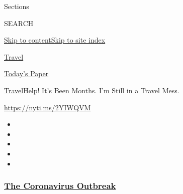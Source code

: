 Sections

SEARCH

\protect\hyperlink{site-content}{Skip to
content}\protect\hyperlink{site-index}{Skip to site index}

\href{https://www.nytimes3xbfgragh.onion/section/travel}{Travel}

\href{https://myaccount.nytimes3xbfgragh.onion/auth/login?response_type=cookie\&client_id=vi}{}

\href{https://www.nytimes3xbfgragh.onion/section/todayspaper}{Today's
Paper}

\href{/section/travel}{Travel}\textbar{}Help! It's Been Months. I'm
Still in a Travel Mess.

\url{https://nyti.ms/2YIWQVM}

\begin{itemize}
\item
\item
\item
\item
\item
\end{itemize}

\hypertarget{the-coronavirus-outbreak}{%
\subsubsection{\texorpdfstring{\href{https://www.nytimes3xbfgragh.onion/news-event/coronavirus?name=styln-coronavirus-national\&region=TOP_BANNER\&variant=undefined\&block=storyline_menu_recirc\&action=click\&pgtype=Article\&impression_id=d127f790-e3b3-11ea-a68a-479821f8f864}{The
Coronavirus
Outbreak}}{The Coronavirus Outbreak}}\label{the-coronavirus-outbreak}}

